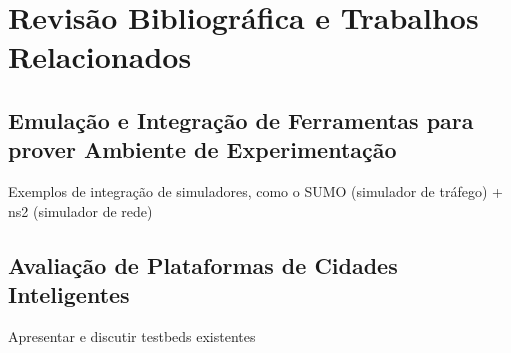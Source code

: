 \chapter{Revisão Bibliográfica e Trabalhos Relacionados}
\label{cap:trab-relacionados}

\section{Emulação e Integração de Ferramentas para prover Ambiente de
Experimentação}

Exemplos de integração de simuladores, como o SUMO (simulador de tráfego) + ns2
(simulador de rede)

\section{Avaliação de Plataformas de Cidades Inteligentes}

Apresentar e discutir testbeds existentes


